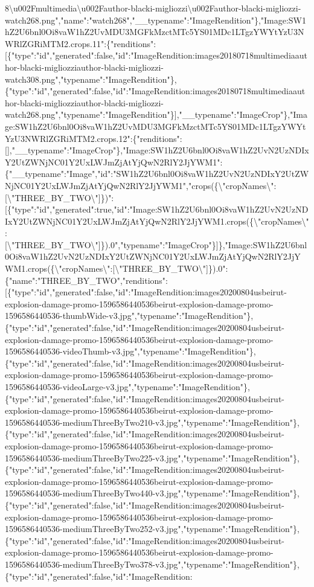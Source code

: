 8\textbackslash{}u002Fmultimedia\textbackslash{}u002Fauthor-blacki-migliozzi\textbackslash{}u002Fauthor-blacki-migliozzi-watch268.png","name":"watch268","\_\_typename":"ImageRendition"\},"Image:SW1hZ2U6bnl0Oi8vaW1hZ2UvMDU3MGFkMzctMTc5YS01MDc1LTgzYWYtYzU3NWRlZGRiMTM2.crops.11":\{"renditions":{[}\{"type":"id","generated":false,"id":"ImageRendition:images20180718multimediaauthor-blacki-migliozziauthor-blacki-migliozzi-watch308.png","typename":"ImageRendition"\},\{"type":"id","generated":false,"id":"ImageRendition:images20180718multimediaauthor-blacki-migliozziauthor-blacki-migliozzi-watch268.png","typename":"ImageRendition"\}{]},"\_\_typename":"ImageCrop"\},"Image:SW1hZ2U6bnl0Oi8vaW1hZ2UvMDU3MGFkMzctMTc5YS01MDc1LTgzYWYtYzU3NWRlZGRiMTM2.crops.12":\{"renditions":{[}{]},"\_\_typename":"ImageCrop"\},"Image:SW1hZ2U6bnl0Oi8vaW1hZ2UvN2UzNDIxY2UtZWNjNC01Y2UxLWJmZjAtYjQwN2RlY2JjYWM1":\{"\_\_typename":"Image","id":"SW1hZ2U6bnl0Oi8vaW1hZ2UvN2UzNDIxY2UtZWNjNC01Y2UxLWJmZjAtYjQwN2RlY2JjYWM1","crops(\{\textbackslash{}"cropNames\textbackslash{}":{[}\textbackslash{}"THREE\_BY\_TWO\textbackslash{}"{]}\})":{[}\{"type":"id","generated":true,"id":"Image:SW1hZ2U6bnl0Oi8vaW1hZ2UvN2UzNDIxY2UtZWNjNC01Y2UxLWJmZjAtYjQwN2RlY2JjYWM1.crops(\{\textbackslash{}"cropNames\textbackslash{}":{[}\textbackslash{}"THREE\_BY\_TWO\textbackslash{}"{]}\}).0","typename":"ImageCrop"\}{]}\},"Image:SW1hZ2U6bnl0Oi8vaW1hZ2UvN2UzNDIxY2UtZWNjNC01Y2UxLWJmZjAtYjQwN2RlY2JjYWM1.crops(\{\textbackslash{}"cropNames\textbackslash{}":{[}\textbackslash{}"THREE\_BY\_TWO\textbackslash{}"{]}\}).0":\{"name":"THREE\_BY\_TWO","renditions":{[}\{"type":"id","generated":false,"id":"ImageRendition:images20200804usbeirut-explosion-damage-promo-1596586440536beirut-explosion-damage-promo-1596586440536-thumbWide-v3.jpg","typename":"ImageRendition"\},\{"type":"id","generated":false,"id":"ImageRendition:images20200804usbeirut-explosion-damage-promo-1596586440536beirut-explosion-damage-promo-1596586440536-videoThumb-v3.jpg","typename":"ImageRendition"\},\{"type":"id","generated":false,"id":"ImageRendition:images20200804usbeirut-explosion-damage-promo-1596586440536beirut-explosion-damage-promo-1596586440536-videoLarge-v3.jpg","typename":"ImageRendition"\},\{"type":"id","generated":false,"id":"ImageRendition:images20200804usbeirut-explosion-damage-promo-1596586440536beirut-explosion-damage-promo-1596586440536-mediumThreeByTwo210-v3.jpg","typename":"ImageRendition"\},\{"type":"id","generated":false,"id":"ImageRendition:images20200804usbeirut-explosion-damage-promo-1596586440536beirut-explosion-damage-promo-1596586440536-mediumThreeByTwo225-v3.jpg","typename":"ImageRendition"\},\{"type":"id","generated":false,"id":"ImageRendition:images20200804usbeirut-explosion-damage-promo-1596586440536beirut-explosion-damage-promo-1596586440536-mediumThreeByTwo440-v3.jpg","typename":"ImageRendition"\},\{"type":"id","generated":false,"id":"ImageRendition:images20200804usbeirut-explosion-damage-promo-1596586440536beirut-explosion-damage-promo-1596586440536-mediumThreeByTwo252-v3.jpg","typename":"ImageRendition"\},\{"type":"id","generated":false,"id":"ImageRendition:images20200804usbeirut-explosion-damage-promo-1596586440536beirut-explosion-damage-promo-1596586440536-mediumThreeByTwo378-v3.jpg","typename":"ImageRendition"\},\{"type":"id","generated":false,"id":"ImageRendition: